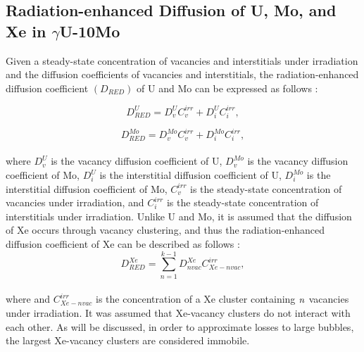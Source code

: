 \documentclass[preprint,12pt]{elsarticle}
\begin{document}
\subsection{Radiation-enhanced Diffusion of U, Mo, and Xe in $\gamma$U-10Mo}
Given a steady-state concentration of vacancies and interstitials under irradiation and the diffusion coefficients of vacancies and interstitials, the radiation-enhanced diffusion coefficient $(D_{RED})$ of U and Mo can be expressed as follows \cite{was2016fundamentals}:

\begin{equation}
D_{RED}^{U}= D_{v}^{U}C_{v}^{irr} + D_{i}^{U}C_{i}^{irr},
\end{equation}

\begin{equation}
D_{RED}^{Mo}= D_{v}^{Mo}C_{v}^{irr} + D_{i}^{Mo}C_{i}^{irr},
\end{equation}
\\
\noindent where $D^{U}_{v}$ is the vacancy diffusion coefficient of U, $D^{Mo}_{v}$ is the vacancy diffusion coefficient of Mo, $D^{U}_{i}$ is the interstitial diffusion coefficient of U, $D^{Mo}_{i}$ is the interstitial diffusion coefficient of Mo, $C^{irr}_{v}$ is the steady-state concentration of vacancies under irradiation, and $C^{irr}_{i}$ is the steady-state concentration of interstitials under irradiation. Unlike U and Mo, it is assumed that the diffusion of Xe occurs through vacancy clustering, and thus the radiation-enhanced diffusion coefficient of Xe can be described as follows \cite{was2016fundamentals}:\\
\begin{equation}
D^{Xe}_{RED} = \sum_{n=1}^{k-1} D_{nvac}^{Xe}C_{Xe-nvac}^{irr},
\end{equation}
\\
\noindent where and $C_{Xe-nvac}^{irr}$ is the concentration of a Xe cluster containing $\it{n}$ vacancies under irradiation. It was assumed that Xe-vacancy clusters do not interact with each other. As will be discussed, in order to approximate losses to large bubbles, the largest Xe-vacancy clusters are considered immobile.
\end{document}
